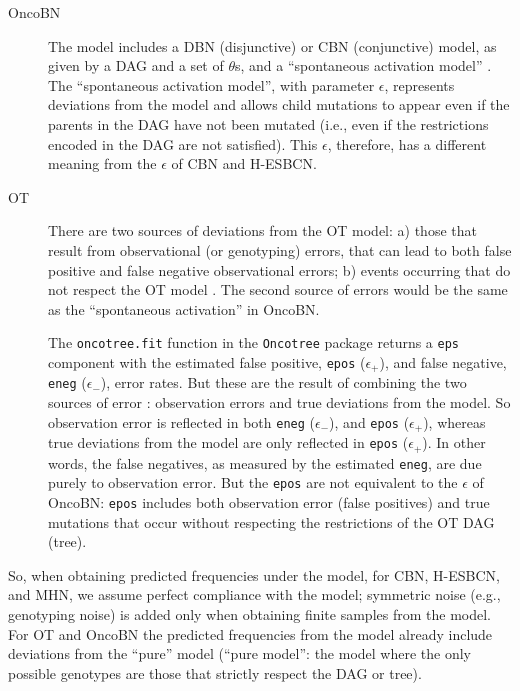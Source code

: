 \documentclass[a4paper,11pt]{article}
\begin{document}
\begin{description}
  
\item[OncoBN] The model includes a DBN (disjunctive) or CBN (conjunctive) model, as given by a DAG and a set of $\theta$s, and a ``spontaneous activation model'' \cite[p.~3-4]{nicol2021oncogenetic}. The ``spontaneous activation model'', with parameter $\epsilon$, represents deviations from the model and allows child mutations to appear even if the parents in the DAG have not been mutated (i.e., even if the restrictions encoded in the DAG are not satisfied). This $\epsilon$, therefore, has a different meaning from the $\epsilon$ of CBN and H-ESBCN.
   
\item[OT] There are two sources of deviations from the OT model: a) those that result from observational (or genotyping) errors, that can lead to both false positive and false negative observational errors; b) events occurring that do not respect the OT model \citep{Szabo2002,Szabo2008}. The second source of errors would be the same as the ``spontaneous activation'' in OncoBN.
  
  The \texttt{oncotree.fit} function in the \texttt{Oncotree} package returns a \texttt{eps} component with the estimated false positive, \texttt{epos} ($\epsilon_+$), and false negative, \texttt{eneg} ($\epsilon_-$), error rates. But these are the result of combining the two sources of error \citep{Szabo2008}: observation errors and true deviations from the model. So observation error is reflected in both \texttt{eneg}  ($\epsilon_-$), and \texttt{epos} ($\epsilon_+$), whereas true deviations from the model are only reflected in \texttt{epos} ($\epsilon_+$). In other words, the false negatives, as measured by the estimated  \texttt{eneg}, are due purely to observation error. But the \texttt{epos} are not equivalent to the $\epsilon$ of OncoBN: \texttt{epos} includes both observation error (false positives) and true mutations that occur without respecting the restrictions of the OT DAG (tree). 
  
\end{description}




So, when obtaining predicted frequencies under the model, for CBN, H-ESBCN, and MHN, we assume perfect compliance with the model; symmetric noise (e.g., genotyping noise) is added only when obtaining finite samples from the model. For OT and OncoBN the predicted frequencies from the model already include deviations from the ``pure'' model (``pure model'': the model where the only possible genotypes are those that strictly respect the DAG or tree).
\end{document}
